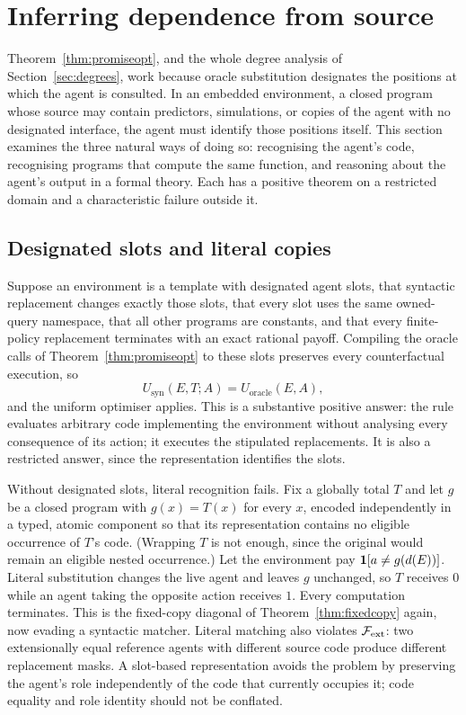 \section{Inferring dependence from source}\label{sec:inference}

Theorem~\ref{thm:promiseopt}, and the whole degree analysis of Section~\ref{sec:degrees}, work
because oracle substitution designates the positions at which the agent is consulted. In an embedded environment, a closed program whose source may contain
predictors, simulations, or copies of the agent with no designated interface, the agent must
identify those positions itself. This section examines the three natural ways of doing so:
recognising the agent's code, recognising programs that compute the same function, and reasoning
about the agent's output in a formal theory. Each has a positive theorem on a restricted domain and a
characteristic failure outside it.

\subsection{Designated slots and literal copies}\label{sec:syntactic}

Suppose an environment is a template with designated agent slots, that syntactic replacement
changes exactly those slots, that every slot uses the same owned-query namespace, that all other
programs are constants, and that every finite-policy replacement terminates with an exact rational
payoff. Compiling the oracle calls of Theorem~\ref{thm:promiseopt} to these slots preserves every
counterfactual execution, so
\[
  U_{\mathrm{syn}}(E,T;A)=U_{\mathrm{oracle}}(E,A),
\]
and the uniform optimiser applies. This is a substantive positive answer: the rule evaluates
arbitrary code implementing the environment without analysing every consequence of its action; it
executes the stipulated replacements. It is also a restricted answer, since the representation
identifies the slots.

Without designated slots, literal recognition fails. Fix a globally total $T$ and let $g$ be a closed
program with $g(x)=T(x)$ for every $x$, encoded independently in a typed, atomic component so that its
representation contains no eligible occurrence of $T$'s code. (Wrapping $T$ is not enough, since the
original would remain an eligible nested occurrence.) Let the environment pay $\mathbf{1}[a\neq g(d(E))]$.
Literal substitution changes the live agent and leaves $g$ unchanged, so $T$ receives $0$ while an
agent taking the opposite action receives $1$. Every computation terminates. This is the fixed-copy
diagonal of Theorem~\ref{thm:fixedcopy} again, now evading a syntactic matcher. Literal matching also
violates $\mathcal{F}_{\mathrm{ext}}$: two extensionally equal reference agents with different source code
produce different replacement masks. A slot-based representation avoids the problem by preserving
the agent's role independently of the code that currently occupies it; code equality and role
identity should not be conflated.

